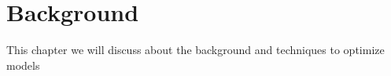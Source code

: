 \chapter{Background}
This chapter we will discuss about the background and techniques to optimize models

% 
% 




% 
% 
